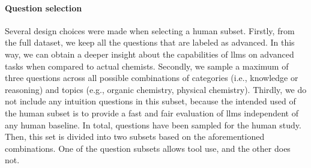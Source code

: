\paragraph{Question selection} \label{sec:subset-selection}

Several design choices were made when selecting a human subset. Firstly, from the full dataset, we keep all the questions that are labeled as advanced. In this way, we can obtain a deeper insight about the capabilities of \glspl{llm} on advanced tasks
when compared to actual chemists. Secondly, we sample a maximum of three questions across all possible combinations of categories (i.e., knowledge or reasoning) and topics (e.g., organic chemistry, physical chemistry). Thirdly, we do not include any intuition questions in this subset, because the intended used of the human subset is to provide a fast and fair evaluation of \glspl{llm} independent of any human baseline. In total,  questions have been sampled for the human study. Then, this set is divided into two subsets based on the aforementioned combinations. One of the question subsets allows tool use, and the other does not.
